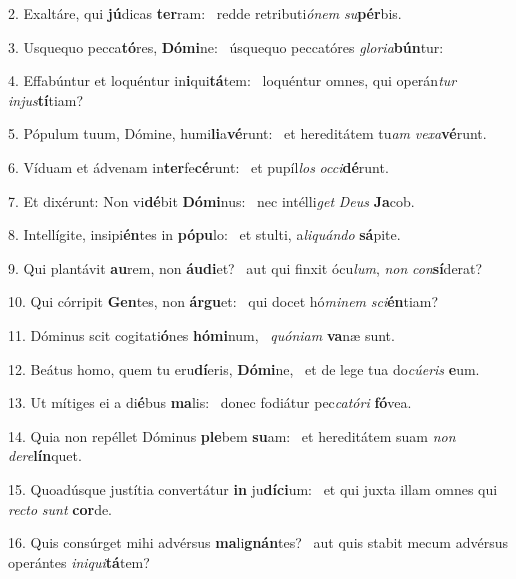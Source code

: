 2. Exaltáre, qui \textbf{jú}dicas \textbf{ter}ram: \ast\  redde retributi\textit{ó}\textit{nem} \textit{su}\textbf{pér}bis.\

3. Usquequo pecca\textbf{tó}res, \textbf{Dó}\textbf{mi}ne: \ast\  úsquequo peccatóres \textit{glo}\textit{ri}\textit{a}\textbf{bún}tur:\

4. Effabúntur et loquéntur in\textbf{i}qui\textbf{tá}tem: \ast\  loquéntur omnes, qui operán\textit{tur} \textit{in}\textit{jus}\textbf{tí}tiam?\

5. Pópulum tuum, Dómine, humi\textbf{li}a\textbf{vé}runt: \ast\  et hereditátem tu\textit{am} \textit{ve}\textit{xa}\textbf{vé}runt.\

6. Víduam et ádvenam in\textbf{ter}fe\textbf{cé}runt: \ast\  et pupíl\textit{los} \textit{oc}\textit{ci}\textbf{dé}runt.\

7. Et dixérunt: Non vi\textbf{dé}bit \textbf{Dó}\textbf{mi}nus: \ast\  nec intélli\textit{get} \textit{De}\textit{us} \textbf{Ja}cob.\

8. Intellígite, insipi\textbf{én}tes in \textbf{pó}\textbf{pu}lo: \ast\  et stulti, a\textit{li}\textit{quán}\textit{do} \textbf{sá}pite.\

9. Qui plantávit \textbf{au}rem, non \textbf{áu}\textbf{di}et? \ast\  aut qui finxit ócu\textit{lum}, \textit{non} \textit{con}\textbf{sí}derat?\

10. Qui córripit \textbf{Gen}tes, non \textbf{ár}\textbf{gu}et: \ast\  qui docet hó\textit{mi}\textit{nem} \textit{sci}\textbf{én}tiam?\

11. Dóminus scit cogitati\textbf{ó}nes \textbf{hó}\textbf{mi}num, \ast\  \textit{quón}\textit{i}\textit{am} \textbf{va}næ sunt.\

12. Beátus homo, quem tu eru\textbf{dí}eris, \textbf{Dó}\textbf{mi}ne, \ast\  et de lege tua do\textit{cú}\textit{e}\textit{ris} \textbf{e}um.\

13. Ut mítiges ei a di\textbf{é}bus \textbf{ma}lis: \ast\  donec fodiátur pec\textit{ca}\textit{tó}\textit{ri} \textbf{fó}vea.\

14. Quia non repéllet Dóminus \textbf{ple}bem \textbf{su}am: \ast\  et hereditátem suam \textit{non} \textit{de}\textit{re}\textbf{lín}quet.\

15. Quoadúsque justítia convertátur \textbf{in} ju\textbf{dí}\textbf{ci}um: \ast\  et qui juxta illam omnes qui \textit{rec}\textit{to} \textit{sunt} \textbf{cor}de.\

16. Quis consúrget mihi advérsus \textbf{ma}li\textbf{gnán}tes? \ast\  aut quis stabit mecum advérsus operántes \textit{in}\textit{i}\textit{qui}\textbf{tá}tem?\

